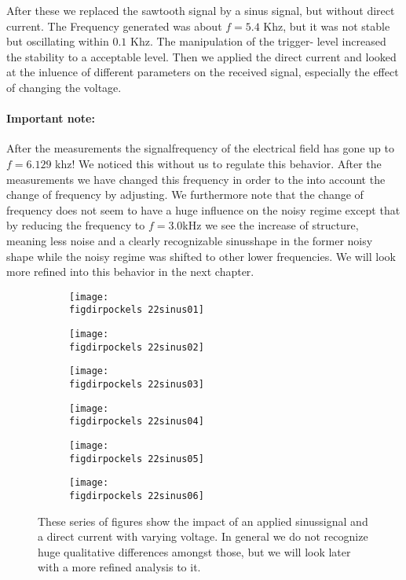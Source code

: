 \flushleft
After these we replaced the sawtooth signal by a sinus signal, but without direct current.
The Frequency generated was about $f=5.4$ Khz, but it was not stable
but oscillating within $0.1$ Khz. The manipulation of the trigger-
level increased the stability to a acceptable level. 
Then we applied the direct current and looked at the inluence of different parameters on
the received signal, especially the effect of changing the
voltage. 
\paragraph{Important note:} After the measurements the
signalfrequency of the electrical field has gone up to 
$f=6.129$ khz! We noticed this without us to regulate this 
behavior. After the measurements we have changed this frequency in
order to the into account the change of frequency by adjusting.
We furthermore note that the change of frequency
does not seem to have a huge influence on the noisy regime except
that by reducing the frequency to $f=3.0$kHz we see the increase
of structure, meaning less noise and a clearly recognizable
sinusshape in the former noisy shape while the noisy regime
was shifted to other lower frequencies. We will look more refined
into this behavior in the next chapter.
\begin{figure}
    \begin{subfigure}[b]{\picwidth}
        \texttt{[image: \\figdirpockels 22sinus01]}
        \caption{}
    \end{subfigure}\qquad
    \begin{subfigure}[b]{\picwidth}
        \texttt{[image: \\figdirpockels 22sinus02]}
        \caption{}
    \end{subfigure}
    \begin{subfigure}[b]{\picwidth}
        \texttt{[image: \\figdirpockels 22sinus03]}
        \caption{}
    \end{subfigure}
    \begin{subfigure}[b]{\picwidth}
        \texttt{[image: \\figdirpockels 22sinus04]}
        \caption{}
    \end{subfigure}
    \begin{subfigure}[b]{\picwidth}
        \texttt{[image: \\figdirpockels 22sinus05]}
        \caption{}
    \end{subfigure}
    \begin{subfigure}[b]{\picwidth}
        \texttt{[image: \\figdirpockels 22sinus06]}
        \caption{}
    \end{subfigure}

    \caption{These series of figures show the impact of
        an applied sinussignal and a direct current with
        varying voltage. In general we do not recognize huge 
        qualitative differences amongst those, but we will look
        later with a more refined analysis to it.}
    \label{fig:sinus1}
\end{figure}
